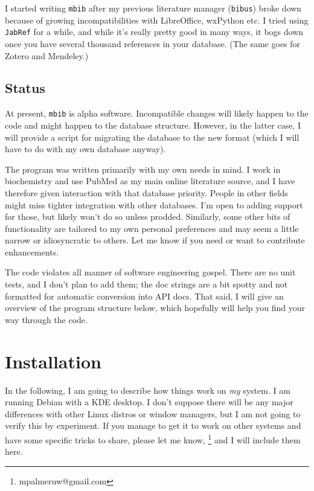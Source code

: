 \documentclass[10pt]{article}
\newcommand*{\mbib}{\texttt{mbib}\xspace}
\newcommand*{\jabref}{\texttt{JabRef}\xspace}
\begin{document}
I started writing \mbib after my previous literature manager (\texttt{bibus}) broke down because of growing incompatibilities with LibreOffice, wxPython etc. I tried using \jabref for a while, and while it's really pretty good in many ways, it bogs down once you have several thousand references in your database. (The same goes for Zotero and Mendeley.)


%

\subsection{Status}

At present, \mbib is alpha software. Incompatible changes will likely happen to the code and might happen to the database structure. However, in the latter case, I will provide a script for migrating the database to the new format (which I will have to do with my own database anyway). 

The program was written primarily with my own needs in mind. I work in biochemistry and use PubMed as my main online literature source, and I have therefore given interaction with that database priority. People in other fields might miss tighter integration with other databases. I'm open to adding support for those, but likely won't do so unless prodded. Similarly, some other bits of functionality are tailored to my own personal preferences and may seem a little narrow or idiosyncratic to others. Let me know if you need or want to contribute enhancements. 

The code violates all manner of software engineering gospel. There are no unit tests, and I don't plan to add them; the doc strings are a bit spotty and not formatted for automatic conversion into API docs. That said, I will give an overview of the program structure below, which hopefully will help you find your way through the code. 

\section{Installation}

In the following, I am going to describe how things work on \emph{my} system. I am running Debian with a KDE desktop. I don't suppose there will be any major differences with other Linux distros or window managers, but I am not going to verify this by experiment. If you manage to get it to work on other systems and have some specific tricks to share, please let me know,%
%
\footnote{mpalmeruw@gmail.com}
%
and I will include them here.
\end{document}
